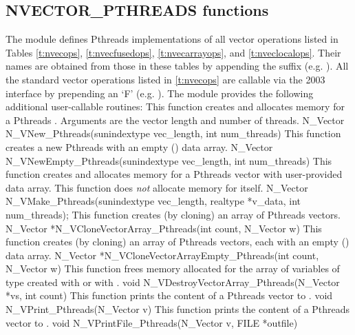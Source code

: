 \subsection{NVECTOR\_PTHREADS functions}
\label{ss:nvec_pthreads_functions}

The {\nvecpthreads} module defines Pthreads implementations of all vector operations listed
in Tables \ref{t:nvecops}, \ref{t:nvecfusedops}, \ref{t:nvecarrayops},
and \ref{t:nveclocalops}. Their names are
obtained from those in these tables by appending the suffix 
(e.g. ).
All the standard vector operations listed in \ref{t:nvecops} are callable via
the {\F} 2003 interface by prepending an `F' (e.g. ).
The module {\nvecpthreads} provides the following additional user-callable routines:
{
  This function creates and allocates memory for a Pthreads .
  Arguments are the vector length and number of threads.
}
{
  N\_Vector N\_VNew\_Pthreads(sunindextype vec\_length, int num\_threads)
}
{
  This function creates a new Pthreads  with an empty () data array.
}
{
  N\_Vector N\_VNewEmpty\_Pthreads(sunindextype vec\_length, int num\_threads)
}
{
  This function creates and allocates memory for a Pthreads vector
  with user-provided data array. This function does {\em not} allocate memory
  for  itself.
}
{
  N\_Vector N\_VMake\_Pthreads(sunindextype vec\_length, realtype *v\_data,
  int num\_threads);
}
{
  This function creates (by cloning) an array of  Pthreads vectors.
}
{
  N\_Vector *N\_VCloneVectorArray\_Pthreads(int count, N\_Vector w)
}
{
  This function creates (by cloning) an array of  Pthreads vectors, each with an
  empty () data array.
}
{
  N\_Vector *N\_VCloneVectorArrayEmpty\_Pthreads(int count, N\_Vector w)
}
{
  This function frees memory allocated for the array of  variables of type
   created with  or with \newline
  .
}
{
  void N\_VDestroyVectorArray\_Pthreads(N\_Vector *vs, int count)
}
{
  This function prints the content of a Pthreads vector to .
}
{
  void N\_VPrint\_Pthreads(N\_Vector v)
}
{
  This function prints the content of a Pthreads vector to .
}
{
  void N\_VPrintFile\_Pthreads(N\_Vector v, FILE *outfile)
}


